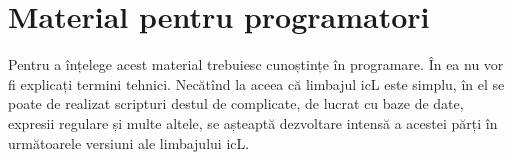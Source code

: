 \part{Material pentru programatori}

Pentru a înțelege acest material trebuiesc cunoștințe în programare. În ea nu vor fi explicați termini tehnici. Necătînd la aceea că limbajul icL este simplu, în el se poate de realizat scripturi destul de complicate, de lucrat cu baze de date, expresii regulare și multe altele, se așteaptă dezvoltare intensă a acestei părți în următoarele versiuni ale limbajului icL.
